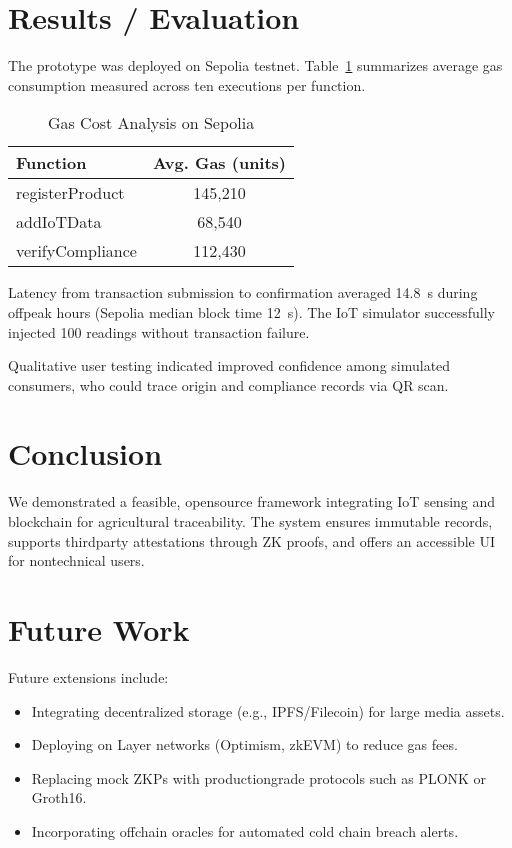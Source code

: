 \documentclass[conference]{IEEEtran}
\begin{document}
\section{Results / Evaluation}
The prototype was deployed on Sepolia testnet. Table~\ref{tab:gas} summarizes average gas consumption measured across ten executions per function.
\begin{table}[h]
    \centering
    \begin{tabular}{|l|c|}
        \hline
        \textbf{Function} & \textbf{Avg. Gas (units)} \\
        \hline
        registerProduct & 145,210 \\
        addIoTData & 68,540 \\
        verifyCompliance & 112,430 \\
        \hline
    \end{tabular}
    \caption{Gas Cost Analysis on Sepolia}
    \label{tab:gas}
\end{table}

Latency from transaction submission to confirmation averaged 14.8~s during off\textendash peak hours (Sepolia median block time 12~s). The IoT simulator successfully injected 100 readings without transaction failure.

Qualitative user testing indicated improved confidence among simulated consumers, who could trace origin and compliance records via QR scan.

\section{Conclusion}
We demonstrated a feasible, open\textendash source framework integrating IoT sensing and blockchain for agricultural traceability. The system ensures immutable records, supports third\textendash party attestations through ZK proofs, and offers an accessible UI for non\textendash technical users.

\section{Future Work}
Future extensions include:
\begin{itemize}
    \item Integrating decentralized storage (e.g., IPFS/Filecoin) for large media assets.
    \item Deploying on Layer networks (Optimism, zkEVM) to reduce gas fees.
    \item Replacing mock ZKPs with production\textendash grade protocols such as PLONK or Groth16.
    \item Incorporating off\textendash chain oracles for automated cold chain breach alerts.
\end{itemize}
\end{document}
